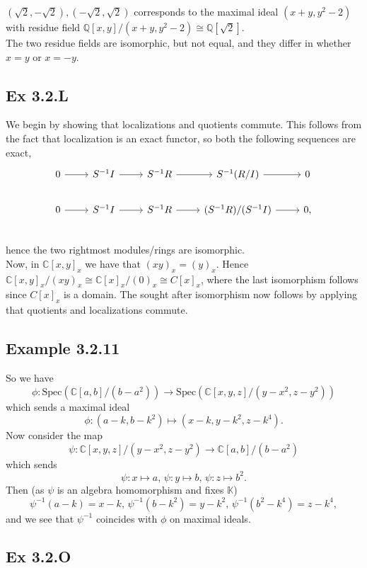 \documentclass{article}
\theoremstyle{definition}
\newcommand{\Q}{\mathbb{Q}}
\newcommand{\C}{\mathbb{C}}
\newcommand{\K}{\mathbb{K}}
\newcommand{\Spec}{\text{Spec}}
\begin{document}
$(\sqrt{2}, -\sqrt{2}), (-\sqrt{2}, \sqrt{2})$ corresponds to the maximal ideal
$(x + y, y^2 - 2)$ with residue field $\Q[x, y]/(x + y, y^2 - 2) \cong
\Q[\sqrt{2}]$. \\

The two residue fields are isomorphic, but not equal, and they differ in
whether $x = y$ or $x = -y$.

\subsection*{Ex 3.2.L}

We begin by showing that localizations and quotients commute. This 
follows from the fact that localization is an exact functor, so both the following
sequences are exact, 
\[
	\begin{tikzcd}
		0 
		\arrow{r} & 
		S^{-1}I
		\arrow{r} & 
		S^{-1}R
		\arrow{r} & 
		S^{-1}(R/I)
		\arrow{r} & 
		0 \\
		0 
		\arrow{r} & 
		S^{-1}I
		\arrow{r} & 
		S^{-1}R
		\arrow{r} & 
		(S^{-1}R)/(S^{-1}I)
		\arrow{r} & 
		0, \\
	\end{tikzcd}
\] 
hence the two rightmost modules/rings are isomorphic. \\

Now, in $\C[x, y]_x$ we have that $(xy)_x = (y)_x$. Hence $\C[x, y]_x / (xy)_x
\cong \C[x]_x / (0)_x \cong C[x]_x$, where the last isomorphism follows since
$C[x]_x$ is a domain. The sought after isomorphism now follows by applying that
quotients and localizations commute.

\subsection*{Example 3.2.11}
So we have
\[
	\phi : \Spec(\C[a, b]/(b-a^2)) \to \Spec(\C[x,y,z]/(y-x^2, z-y^2))
\]
which sends a maximal ideal
\[
	\phi 
	: 
	(a - k, b - k^2) 
	\mapsto
	(x - k, y - k^2, z - k^4).
\]
Now consider the map 
\[
	\psi : 
	\C[x,y,z]/(y-x^2, z-y^2)
	\to 
	\C[a, b]/(b-a^2)
\]
which sends
\[
	\psi : x \mapsto a, \, 
	\psi : y \mapsto b, \,
	\psi : z \mapsto b^2.
\]
Then (as $\psi$ is an algebra homomorphism and fixes $\K$)
\[
	\psi^{-1}(a - k) = x - k, \,
	\psi^{-1}(b - k^2) = y - k^2, \,
	\psi^{-1}(b^2 - k^4) = z - k^4,
\]
and we see that $\psi^{-1}$ coincides with $\phi$ on maximal ideals.

\subsection*{Ex 3.2.O}
\end{document}
